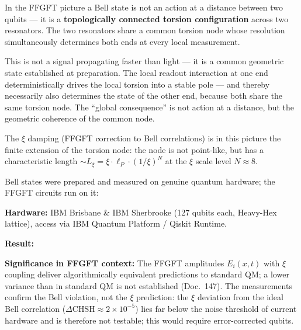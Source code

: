 \begin{foundation}
In the FFGFT picture a Bell state is not an
action at a distance between two qubits ---
it is a \textbf{topologically connected
torsion configuration} across two resonators.
The two resonators share a common
torsion node whose resolution
simultaneously determines both ends
at every local measurement.

This is not a signal propagating faster than light ---
it is a common geometric state established at preparation.
The local readout interaction at one end
deterministically drives the local torsion into a
stable pole --- and thereby necessarily also
determines the state of the other end, because both share the same
torsion node.
The ``global consequence'' is not action at a distance,
but the geometric coherence of the common node.

The $\xi$ damping (FFGFT correction to Bell correlations)
is in this picture the finite extension of the
torsion node: the node is not point-like,
but has a characteristic length
$\sim L_\xi = \xi \cdot \ell_P \cdot (1/\xi)^N$
at the $\xi$ scale level $N \approx 8$.
\end{foundation}

\begin{keyresult}
Bell states were prepared and measured on genuine quantum
hardware; the FFGFT circuits run on it:

\textbf{Hardware:} IBM Brisbane \& IBM Sherbrooke (127 qubits each,
Heavy-Hex lattice), access via IBM Quantum Platform / Qiskit Runtime.

\textbf{Result:}
\begin{center}
{\footnotesize
{}
} %
\end{center}

\textbf{Significance in FFGFT context:}
The FFGFT amplitudes $E_i(x,t)$ with $\xi$ coupling deliver
algorithmically equivalent predictions to standard QM;
a lower variance than in standard QM is not established (Doc.~147).
The measurements confirm the Bell violation, not the $\xi$ prediction:
the $\xi$ deviation from the ideal Bell correlation
($\Delta\text{CHSH} \approx 2\times10^{-5}$) lies far below
the noise threshold of current hardware and is therefore not testable;
this would require error-corrected qubits.
\end{keyresult}

